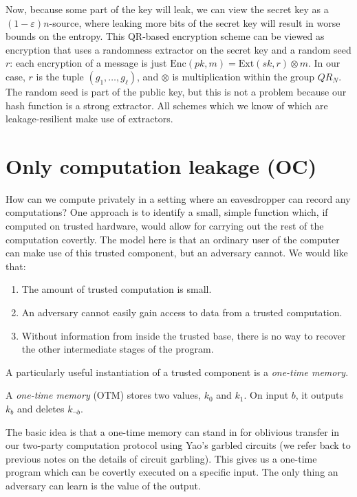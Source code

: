 \documentclass[10pt]{article}
\begin{document}
Now, because some part of the key will leak, we can view the secret key as a $(1-\varepsilon)n$-source, where leaking more bits of the secret key will result in worse bounds on the entropy. This QR-based encryption scheme can be viewed as encryption that uses a randomness extractor on the secret key and a random seed $r$: each encryption of a message is just $\mathrm{Enc}(pk,m) = \mathrm{Ext}(sk,r) \otimes m$. In our case, $r$ is the tuple $(g_1,\dots,g_\ell)$, and $\otimes$ is multiplication within the group $QR_N$. The random seed is part of the public key, but this is not a problem because our hash
function is a strong extractor. All schemes which we know of which are leakage-resilient make
use of extractors.

\section{Only computation leakage (OC)}

How can we compute privately in a setting where an eavesdropper can record any computations? One approach is to identify a small, simple function which, if computed on trusted hardware, would allow for carrying out the rest of the computation covertly. The model here is that an ordinary user of the computer can make use of this trusted component, but an adversary cannot. We would like that:
\begin{enumerate}
\item The amount of trusted computation is small.
\item An adversary cannot easily gain access to data from a trusted computation.
\item Without information from inside the trusted base, there is no way to recover the other intermediate stages of the program.
\end{enumerate}
A particularly useful instantiation of a trusted component is a \emph{one-time memory}.

\begin{definition}
A \emph{one-time memory} (OTM) stores two values, $k_0$ and $k_1$. On input $b$, it outputs $k_b$ and deletes $k_{\neg b}$.
\end{definition}

The basic idea is that a one-time memory can stand in for oblivious transfer in our two-party computation protocol using Yao's garbled circuits (we refer back to previous notes on the details of circuit garbling). This gives us a one-time program which can be covertly executed on a specific input. The only thing an adversary can learn is the value of the output.
\end{document}
